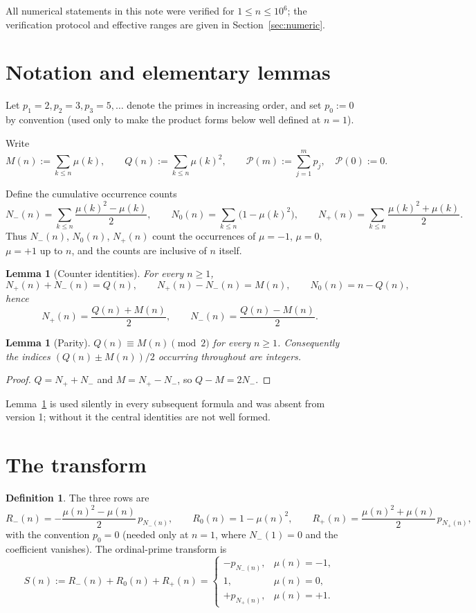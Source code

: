 \documentclass[11pt]{amsart}
\newtheorem{lemma}[theorem]{Lemma}
\theoremstyle{definition}
\newtheorem{definition}[theorem]{Definition}
\newcommand{\mob}{\mu}
\newcommand{\Mert}{M}
\newcommand{\Sq}{Q}
\newcommand{\PS}{\mathcal P}
\begin{document}
All numerical statements in this note were verified for $1\le n\le10^{6}$; the
verification protocol and effective ranges are given in
Section~\ref{sec:numeric}.

\section{Notation and elementary lemmas}

Let $p_1=2,p_2=3,p_3=5,\ldots$ denote the primes in increasing order, and set
$p_0:=0$ by convention (used only to make the product forms below well defined
at $n=1$).

Write
\[
\Mert(n):=\sum_{k\le n}\mob(k),
\qquad
\Sq(n):=\sum_{k\le n}\mob(k)^2 ,
\qquad
\PS(m):=\sum_{j=1}^{m}p_j ,\quad \PS(0):=0 .
\]

Define the cumulative occurrence counts
\[
N_-(n)=\sum_{k\le n}\frac{\mob(k)^2-\mob(k)}2,
\qquad
N_0(n)=\sum_{k\le n}\bigl(1-\mob(k)^2\bigr),
\qquad
N_+(n)=\sum_{k\le n}\frac{\mob(k)^2+\mob(k)}2 .
\]
Thus $N_-(n)$, $N_0(n)$, $N_+(n)$ count the occurrences of $\mob=-1$, $\mob=0$,
$\mob=+1$ up to $n$, and the counts are inclusive of $n$ itself.

\begin{lemma}[Counter identities]\label{lem:counters}
For every $n\ge1$,
\[
N_+(n)+N_-(n)=\Sq(n),
\qquad
N_+(n)-N_-(n)=\Mert(n),
\qquad
N_0(n)=n-\Sq(n),
\]
hence
\[
N_+(n)=\frac{\Sq(n)+\Mert(n)}2,
\qquad
N_-(n)=\frac{\Sq(n)-\Mert(n)}2 .
\]
\end{lemma}

\begin{lemma}[Parity]\label{lem:parity}
$\Sq(n)\equiv \Mert(n)\pmod 2$ for every $n\ge1$. Consequently the indices
$(\Sq(n)\pm\Mert(n))/2$ occurring throughout are integers.
\end{lemma}

\begin{proof}
$\Sq=N_++N_-$ and $\Mert=N_+-N_-$, so $\Sq-\Mert=2N_-$.
\end{proof}

Lemma~\ref{lem:parity} is used silently in every subsequent formula and was
absent from version 1; without it the central identities are not well formed.

\section{The transform}

\begin{definition}
The three rows are
\[
R_-(n)=-\frac{\mob(n)^2-\mob(n)}2\,p_{N_-(n)},
\qquad
R_0(n)=1-\mob(n)^2,
\qquad
R_+(n)=\frac{\mob(n)^2+\mob(n)}2\,p_{N_+(n)} ,
\]
with the convention $p_0=0$ (needed only at $n=1$, where $N_-(1)=0$ and the
coefficient vanishes). The ordinal-prime transform is
\[
S(n):=R_-(n)+R_0(n)+R_+(n)
=
\begin{cases}
-p_{N_-(n)},&\mob(n)=-1,\\[1mm]
1,&\mob(n)=0,\\[1mm]
+p_{N_+(n)},&\mob(n)=+1 .
\end{cases}
\]
\end{definition}
\end{document}
